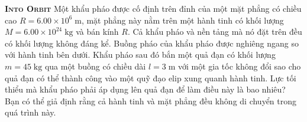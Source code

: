 \begin{problem}{\textbf{\textsc{Into Orbit}}} Một khẩu pháo được cố định trên đỉnh của một mặt phẳng có chiều cao $R = 6.00 \times 10^6\;\mathrm{m}$, mặt phẳng này nằm trên một hành tinh có khối lượng $M = 6.00 \times 10^{24}\;\mathrm{kg}$ và bán kính $R$. Cả khẩu pháo và nền tảng mà nó đặt trên đều có khối lượng không đáng kể. Buồng pháo của khẩu pháo được nghiêng ngang so với hành tinh bên dưới. Khẩu pháo sau đó bắn một quả đạn có khối lượng $m = 45\;\mathrm{kg}$ qua một buồng có chiều dài $l=3\;\mathrm{m}$ với một gia tốc không đổi sao cho quả đạn có thể thành công vào một quỹ đạo elip xung quanh hành tinh. Lực tối thiểu mà khẩu pháo phải áp dụng lên quả đạn để làm điều này là bao nhiêu? Bạn có thể giả định rằng cả hành tinh và mặt phẳng đều không di chuyển trong quá trình này.\end{problem}